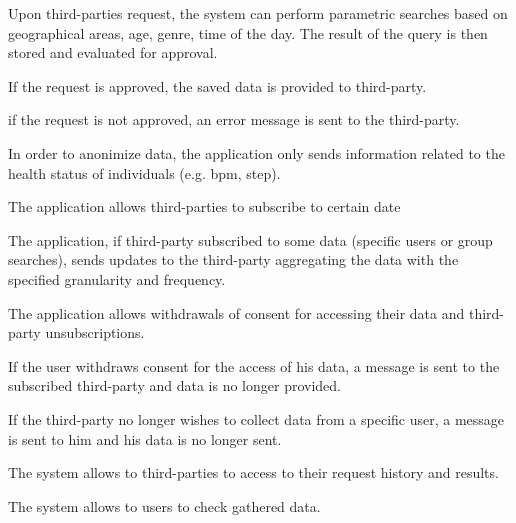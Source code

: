 \begin{enumerate}[label={[}R1.\arabic*{]}]
    \item Upon third-parties request, the system can perform parametric searches based on geographical areas, age, genre, time of the day. The result of the query is then stored and evaluated for approval.
    \begin{enumerate}[label={[}R1.\arabic{enumi}.\arabic*{]}, leftmargin=*]
        \item If the request is approved, the saved data is provided to third-party.
        \item if the request is not approved, an error message is sent to the third-party.
        \item In order to anonimize data, the application only sends information related to the health status of individuals (e.g. bpm, step).
    \end{enumerate}
        
    \item The application allows third-parties to subscribe to certain date
    \begin{enumerate}[label={[}R1.\arabic{enumi}.\arabic*{]}, leftmargin=*]
        \item The application, if third-party subscribed to some data (specific users or group searches), sends updates to the third-party aggregating the data with the specified granularity and frequency.
    \end{enumerate}
        
    \item The application allows withdrawals of consent for accessing their data and third-party unsubscriptions.
    \begin{enumerate}[label={[}R1.\arabic{enumi}.\arabic*{]}, leftmargin=*]
        \item If the user withdraws consent for the access of his data, a message is sent to the subscribed third-party and data is no longer provided.
        \item If the third-party no longer wishes to collect data from a specific user, a message is sent to him and his data is no longer sent.
    \end{enumerate}
        
        
    \item The system allows to third-parties to access to their request history and results.
    
    \item The system allows to users to check gathered data.

\end{enumerate}


